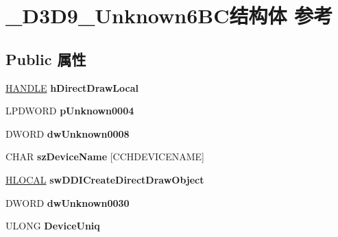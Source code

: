 \hypertarget{struct___d3_d9___unknown6_b_c}{}\section{\+\_\+\+D3\+D9\+\_\+\+Unknown6\+B\+C结构体 参考}
\label{struct___d3_d9___unknown6_b_c}
\subsection*{Public 属性}
\begin{DoxyCompactItemize}
\item 
\mbox{\label{struct___d3_d9___unknown6_b_c_a2b02b11d70f65d3c8640cab244dcbeb7}} 
\hyperlink{interfacevoid}{H\+A\+N\+D\+LE} {\bfseries h\+Direct\+Draw\+Local}
\item 
\mbox{\label{struct___d3_d9___unknown6_b_c_ab438362e28a7964d354ba5e9e9a345eb}} 
L\+P\+D\+W\+O\+RD {\bfseries p\+Unknown0004}
\item 
\mbox{\label{struct___d3_d9___unknown6_b_c_a7775de9363a1619c1271443a232b24b2}} 
D\+W\+O\+RD {\bfseries dw\+Unknown0008}
\item 
\mbox{\label{struct___d3_d9___unknown6_b_c_a8d7c783912562fd3a1ed99e34f681c5b}} 
C\+H\+AR {\bfseries sz\+Device\+Name} \mbox{[}C\+C\+H\+D\+E\+V\+I\+C\+E\+N\+A\+ME\mbox{]}
\item 
\mbox{\label{struct___d3_d9___unknown6_b_c_ab4da6a55df11623e7239e8c9ea9cba0d}} 
\hyperlink{interfacevoid}{H\+L\+O\+C\+AL} {\bfseries sw\+D\+D\+I\+Create\+Direct\+Draw\+Object}
\item 
\mbox{\label{struct___d3_d9___unknown6_b_c_a0beeead9028b32830a6b602578f4375e}} 
D\+W\+O\+RD {\bfseries dw\+Unknown0030}
\item 
\mbox{\label{struct___d3_d9___unknown6_b_c_a78e588489b34a41b0bbba973f26c55f3}} 
U\+L\+O\+NG {\bfseries Device\+Uniq}
\item 
\mbox{\label{struct___d3_d9___unknown6_b_c_a7cd7d55ac47f20825e9aede191455827}} 

\end{DoxyCompactItemize}
